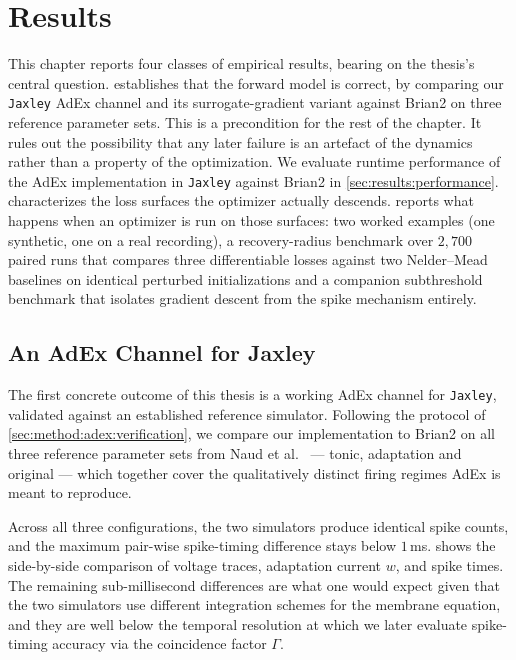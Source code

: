 \chapter{Results}\label{ch:results}




This chapter reports four classes of empirical results, bearing on the thesis's central question.
 establishes that the forward model is correct, by comparing our \texttt{Jaxley} \gls{AdEx} channel and its surrogate-gradient variant against Brian2 on three reference parameter sets.
This is a precondition for the rest of the chapter.
It rules out the possibility that any later failure is an artefact of the dynamics rather than a property of the optimization.
We evaluate runtime performance of the \gls{AdEx} implementation in \texttt{Jaxley} against Brian2 in \cref{sec:results:performance}.
 characterizes the loss surfaces the optimizer actually descends.
 reports what happens when an optimizer is run on those surfaces:
two worked examples (one synthetic, one on a real recording),
a recovery-radius benchmark over $2{,}700$ paired runs that compares three differentiable losses against two Nelder--Mead baselines on identical perturbed initializations
and a companion subthreshold benchmark that isolates gradient descent from the spike mechanism entirely.

\section{An AdEx Channel for Jaxley}\label{sec:results:verification}

The first concrete outcome of this thesis is a working \gls{AdEx} channel for \texttt{Jaxley}, validated against an established reference simulator.
Following the protocol of \cref{sec:method:adex:verification}, we compare our implementation to Brian2 \cite{Stimberg2019} on all three reference parameter sets from Naud et al.~\cite{Naud2008} --- tonic, adaptation and original --- which together cover the qualitatively distinct firing regimes \gls{AdEx} is meant to reproduce.

Across all three configurations, the two simulators produce identical spike counts, and the maximum pair-wise spike-timing difference stays below $1$\,ms.
 shows the side-by-side comparison of voltage traces, adaptation current $w$, and spike times.
The remaining sub-millisecond differences are what one would expect given that the two simulators use different integration schemes for the membrane equation, and they are well below the temporal resolution at which we later evaluate spike-timing accuracy via the coincidence factor $\Gamma$.


